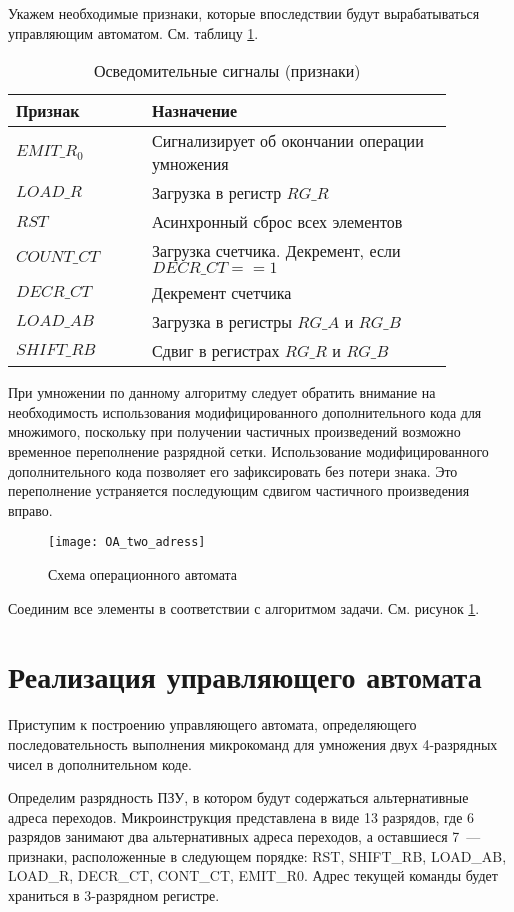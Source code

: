 \documentclass[a4paper,14pt]{extarticle}
\begin{document}
Укажем необходимые признаки, которые впоследствии будут вырабатываться управляющим автоматом. См. таблицу \ref{tab:signals}.
\begin{table}[hbtp]
	\centering
	\begin{tabular}{|p{0.27\linewidth}|p{0.6\linewidth}|}
		\hline
		\textbf{Признак} & \textbf{Назначение} \\ \hline
		$EMIT\_R_0$ & Сигнализирует об окончании операции умножения \\ \hline
		$LOAD\_R$ & Загрузка в регистр $RG\_R$ \\ \hline
		$RST$ & Асинхронный сброс всех элементов \\ \hline
		$COUNT\_CT$ & Загрузка счетчика. Декремент, если $DECR\_CT==1$ \\ \hline
		$DECR\_CT$ & Декремент счетчика \\ \hline
		$LOAD\_AB$ & Загрузка в регистры $RG\_A \text{ и } RG\_B$ \\ \hline
		$SHIFT\_RB$ & Сдвиг в регистрах $RG\_R \text{ и } RG\_B$ \\ \hline
	\end{tabular}
	\caption{Осведомительные сигналы (признаки)}
	\label{tab:signals}
\end{table}


При умножении по данному алгоритму следует обратить внимание на необходимость использования модифицированного дополнительного кода для множимого, поскольку при получении частичных произведений возможно временное переполнение разрядной сетки. Использование модифицированного дополнительного кода позволяет его зафиксировать без потери знака. Это переполнение устраняется последующим сдвигом частичного произведения вправо. 

\begin{figure}[h!]
	\centering
	\texttt{[image: OA\_two\_adress]}
	\caption {Схема операционного автомата}
	\label{img:oa}
\end{figure}

Соединим все элементы в соответствии с алгоритмом задачи. См. рисунок \ref{img:oa}.
\newpage
\section {Реализация управляющего автомата}
Приступим к построению управляющего автомата, определяющего последовательность выполнения микрокоманд для умножения двух 4-разрядных чисел в дополнительном коде.

Определим разрядность ПЗУ, в котором будут содержаться альтернативные адреса переходов. Микроинструкция представлена в виде 13 разрядов, где 6 разрядов занимают два альтернативных адреса переходов, а оставшиеся 7~--- признаки, расположенные в следующем порядке: RST, SHIFT\_RB, LOAD\_AB, LOAD\_R, DECR\_CT, CONT\_CT, EMIT\_R0. Адрес текущей команды будет храниться в 3-разрядном регистре.
\end{document}
